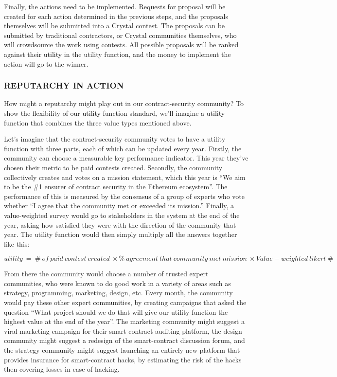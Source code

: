 Finally, the actions need to be implemented. Requests for proposal will
be created for each action determined in the previous steps, and the
proposals themselves will be submitted into a Crystal contest. The
proposals can be submitted by traditional contractors, or Crystal
communities themselves, who will crowdsource the work using contests.
All possible proposals will be ranked against their utility in the
utility function, and the money to implement the action will go to the
winner.

\subsubsection{\texorpdfstring{\protect\hypertarget{_1qeh74d4cvuh}{}{\protect\hypertarget{_Toc462050422}{}{}}REPUTARCHY
IN ACTION}{REPUTARCHY IN ACTION}}\label{reputarchy-in-action}

How might a reputarchy might play out in our contract-security
community? To show the flexibility of our utility function standard,
we'll imagine a utility function that combines the three value types
mentioned above.

Let's imagine that the contract-security community votes to have a
utility function with three parts, each of which can be updated every
year. Firstly, the community can choose a measurable key performance
indicator. This year they've chosen their metric to be paid contests
created. Secondly, the community collectively creates and votes on a
mission statement, which this year is ``We aim to be the \#1 ensurer of
contract security in the Ethereum ecosystem''. The performance of this
is measured by the consensus of a group of experts who vote whether ``I
agree that the community met or exceeded its mission.'' Finally, a
value-weighted survey would go to stakeholders in the system at the end
of the year, asking how satisfied they were with the direction of the
community that year. The utility function would then simply multiply all
the answers together like this:

\[utility\  = \ \#\ of\ paid\ contest\ created\  \times \%\ agreement\ that\ community\ met\ mission\  \times Value - weighted\ likert\ \#\]

From there the community would choose a number of trusted expert
communities, who were known to do good work in a variety of areas such
as strategy, programming, marketing, design, etc. Every month, the
community would pay these other expert communities, by creating
campaigns that asked the question ``What project should we do that will
give our utility function the highest value at the end of the year''.
The marketing community might suggest a viral marketing campaign for
their smart-contract auditing platform, the design community might
suggest a redesign of the smart-contract discussion forum, and the
strategy community might suggest launching an entirely new platform that
provides insurance for smart-contract hacks, by estimating the risk of
the hacks then covering losses in case of hacking.

